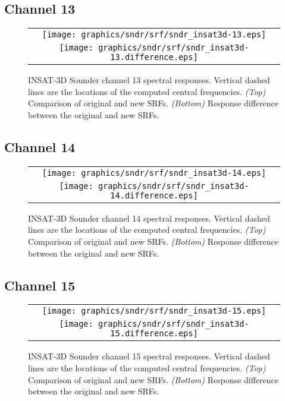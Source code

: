 \subsection{Channel 13}
\begin{figure}[H]
  \label{fig:sndr_ch13}
  \centering
  \begin{tabular}{c}
    \texttt{[image: graphics/sndr/srf/sndr\_insat3d-13.eps]} \\
    \texttt{[image: graphics/sndr/srf/sndr\_insat3d-13.difference.eps]}
  \end{tabular}
  \caption{INSAT-3D Sounder channel 13 spectral responses. Vertical dashed lines are the locations of the computed central frequencies. \emph{(Top)} Comparison of original and new SRFs. \emph{(Bottom)} Response difference between the original and new SRFs.}
\end{figure}

\subsection{Channel 14}
\begin{figure}[H]
  \label{fig:sndr_ch14}
  \centering
  \begin{tabular}{c}
    \texttt{[image: graphics/sndr/srf/sndr\_insat3d-14.eps]} \\
    \texttt{[image: graphics/sndr/srf/sndr\_insat3d-14.difference.eps]}
  \end{tabular}
  \caption{INSAT-3D Sounder channel 14 spectral responses. Vertical dashed lines are the locations of the computed central frequencies. \emph{(Top)} Comparison of original and new SRFs. \emph{(Bottom)} Response difference between the original and new SRFs.}
\end{figure}

\subsection{Channel 15}
\begin{figure}[H]
  \label{fig:sndr_ch15}
  \centering
  \begin{tabular}{c}
    \texttt{[image: graphics/sndr/srf/sndr\_insat3d-15.eps]} \\
    \texttt{[image: graphics/sndr/srf/sndr\_insat3d-15.difference.eps]}
  \end{tabular}
  \caption{INSAT-3D Sounder channel 15 spectral responses. Vertical dashed lines are the locations of the computed central frequencies. \emph{(Top)} Comparison of original and new SRFs. \emph{(Bottom)} Response difference between the original and new SRFs.}
\end{figure}

